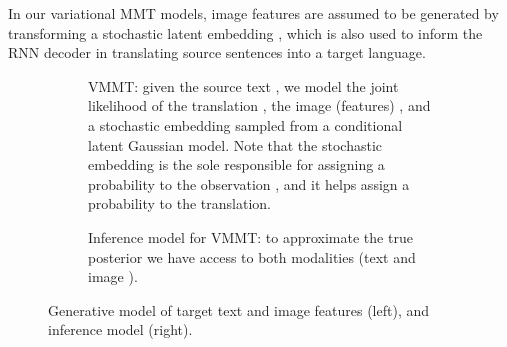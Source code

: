 \documentclass[11pt,a4paper]{article}
\newcommand{\cond}{VMMT\xspace}
\begin{document}
In our variational MMT models, image features are assumed to be generated by transforming a stochastic latent embedding , which is 
also used to inform the RNN decoder in translating source sentences into a target language.

\begin{figure*}[ht!]
  \centering
  \begin{subfigure}[t]{0.45\linewidth}\centering
    \caption{\label{fig:vmmtc-gen}\cond: given the source text , we model the joint likelihood of the translation , the image (features) , and a stochastic embedding  sampled from a conditional latent Gaussian model. Note that the stochastic embedding is the sole responsible for assigning a probability to the observation , and it helps assign a probability to the translation.}
  \end{subfigure}
  \hfill
  \begin{subfigure}[t]{0.45\linewidth}\centering
    \caption{\label{fig:vmmtc-inf}Inference model for \cond: to approximate the true posterior we have access to both modalities (text  and image ).}
  \end{subfigure}
  \caption{\label{fig:vmmt}Generative model of target text and image features (left), and inference model (right).}
\end{figure*}
\end{document}
